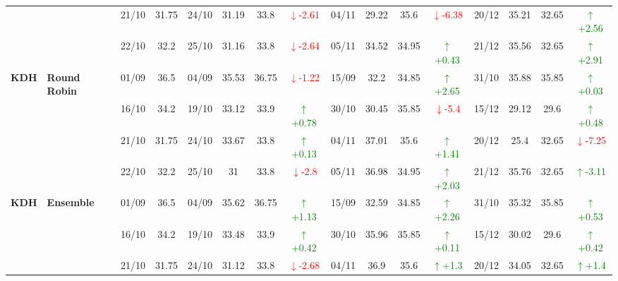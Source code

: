 \documentclass{ieeeaccess}
\begin{document}
{\begin{longtable}{llcc|cccc|cccc|cccc}
&
& 21/10 & 31.75 & 24/10 & 31.19 & 33.8 & \textcolor{red}{\(\downarrow\)-2.61} & 04/11 & 29.22 & 35.6 & \textcolor{red}{\(\downarrow\)-6.38} & 20/12 & 35.21 & 32.65 &\textcolor{green}{\(\uparrow\)+2.56}\\

&
& 22/10 & 32.2 & 25/10 & 31.16 & 33.8 & \textcolor{red}{\(\downarrow\)-2.64} & 05/11 & 34.52 & 34.95 & \textcolor{green}{\(\uparrow\)+0.43} & 21/12 & 35.56 & 32.65 & \textcolor{green}{\(\uparrow\)+2.91} \\
\midrule


\multirow{4}{*}{\textbf{KDH}} 
& \textbf{Round Robin}
& 01/09 & 36.5 & 04/09 & 35.53 & 36.75 & \textcolor{red}{\(\downarrow\)-1.22} & 15/09 & 32.2 & 34.85 & \textcolor{green}{\(\uparrow\)+2.65} & 31/10 & 35.88 & 35.85 & \textcolor{green}{\(\uparrow\)+0.03} \\

&
& 16/10 & 34.2 & 19/10 & 33.12 & 33.9 & \textcolor{green}{\(\uparrow\)+0.78} & 30/10 & 30.45 & 35.85 & \textcolor{red}{\(\downarrow\)-5.4} & 15/12 & 29.12 & 29.6 & \textcolor{green}{\(\uparrow\)+0.48} \\

&
& 21/10 & 31.75 & 24/10 & 33.67 & 33.8 & \textcolor{green}{\(\uparrow\)+0.13} & 04/11 & 37.01 & 35.6 & \textcolor{green}{\(\uparrow\)+1.41} & 20/12 & 25.4 & 32.65 &\textcolor{red}{\(\downarrow\)-7.25}\\

&
& 22/10 & 32.2 & 25/10 & 31 & 33.8 & \textcolor{red}{\(\downarrow\)-2.8} & 05/11 & 36.98 & 34.95 & \textcolor{green}{\(\uparrow\)+2.03} & 21/12 & 35.76 & 32.65 & \textcolor{green}{\(\uparrow\)-3.11} \\
\midrule



\multirow{4}{*}{\textbf{KDH}} 
& \textbf{Ensemble}
& 01/09 & 36.5 & 04/09 & 35.62 & 36.75 & \textcolor{green}{\(\uparrow\)+1.13} & 15/09 & 32.59 & 34.85 & \textcolor{green}{\(\uparrow\)+2.26} & 31/10 & 35.32 & 35.85 & \textcolor{green}{\(\uparrow\)+0.53} \\

&
& 16/10 & 34.2 & 19/10 & 33.48 & 33.9 & \textcolor{green}{\(\uparrow\)+0.42} & 30/10 & 35.96 & 35.85 & \textcolor{green}{\(\uparrow\)+0.11} & 15/12 & 30.02 & 29.6 & \textcolor{green}{\(\uparrow\)+0.42} \\

&
& 21/10 & 31.75 & 24/10 & 31.12 & 33.8 & \textcolor{red}{\(\downarrow\)-2.68} & 04/11 & 36.9 & 35.6 & \textcolor{green}{\(\uparrow\)+1.3} & 20/12 & 34.05 & 32.65 &\textcolor{green}{\(\uparrow\)+1.4}\\


\end{longtable}}
\end{document}
